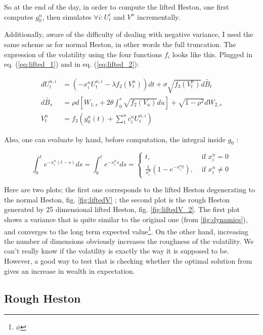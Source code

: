 So at the end of the day, in order to compute the lifted Heston, one first computes $g_0^n$, then simulates $\forall i \colon U_t^i$ and $V^n$ incrementally. 

Additionally, aware of the difficulty of dealing with negative variance, I used the same scheme as for normal Heston, in other words the full truncation. The expression of the volatility using the four functions $f_i$ looks like this. Plugged in eq. (\ref{eq:lifted_1}) and in eq. (\ref{eq:lifted_2}):

\begin{align*}
dU_t^{n,i} &= \left ( - x_i^n U_t^{n,i} - \lambda f_2(V_t^n) \right ) dt + \sigma \sqrt{ f_3(V_t^n) }  d \widetilde{B_t} \\
d \widetilde{B_s } &= \rho d [ W_{1,s} + 2 \theta \int_0^s \sqrt{ f_2(V_u) } du ] + \sqrt{ 1 - \rho^2 } d W_{2,s} \\
V_t^n &= f_3 \left ( g_0^n (t) + \sum^n_1 c_i^n U_t^{n,i} \right )
\end{align*}

Also, one can evaluate by hand, before computation, the integral inside $g_0$ :

$$ \int_0^t e^{-x_i^n (t-s) } ds  
= \int_0^t e^{-x_i^n s } ds 
= \begin{cases} 
t, & \mbox{ if } x_i^n = 0 
\\ 
\frac {1} { x_i^n } ( 1 - e^{-x_i^n t } )  , & \mbox{ if } x_i^n \neq 0   
\end{cases}
$$ 

Here are two plots; the first one corresponds to the lifted Heston degenerating to the normal Heston, fig. \ref{fig:liftedV} ; the second plot is the rough Heston generated by 25 dimensional lifted Heston, fig. \ref{fig:liftedV_2}. The first plot shows a variance that is quite similar to the original one (from \ref{fig:dynamics}), and converges to the long term expected value\footnote{$\phi$}. On the other hand, increasing the number of dimensions obviously increases the roughness of the volatility. We can't really know if the volatility is exactly the way it is supposed to be. However, a good way to test that is checking whether the optimal solution from \cite{HanWong} gives an increase in wealth in expectation.



\subsection{Rough Heston}
\label{rough}

